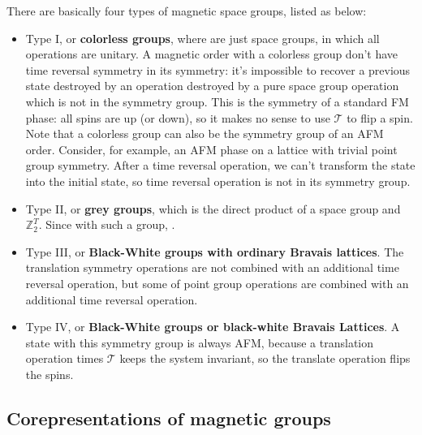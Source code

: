 \documentclass[hyperref, a4paper]{article}
\newcommand*{\concept}[1]{{\textbf{#1}}}
\begin{document}
There are basically four types of magnetic space groups, listed as below:
\begin{itemize}
    \item Type I, or \concept{colorless groups}, where are just space groups, in which all operations are 
    unitary. A magnetic order with a colorless group don't have time reversal symmetry in its symmetry: 
    it's impossible to recover a previous state destroyed by an operation destroyed by a pure space group 
    operation which is not in the symmetry group. This is the symmetry of a standard FM phase: all spins 
    are up (or down), so it makes no sense to use $\mathcal{T}$ to flip a spin. 
    Note that a colorless group can also be the symmetry group of an AFM order. Consider, for example, 
    an AFM phase on a lattice with trivial point group symmetry. After a time reversal operation, we can't 
    transform the state into the initial state, so time reversal operation is not in its symmetry group. 
    \item Type II, or \concept{grey groups}, which is the direct product of a space group and $\mathbb{Z}_2^T$.
    Since with such a group, .
    \item Type III, or \concept{Black-White groups with ordinary Bravais lattices}. The translation symmetry 
    operations are not combined with an additional time reversal operation, but some of point group operations 
    are combined with an additional time reversal operation. 
    \item Type IV, or \concept{Black-White groups or black-white Bravais Lattices}. A state with this symmetry
    group is always AFM, because a translation operation times $\mathcal{T}$ keeps the system invariant, 
    so the translate operation flips the spins.
\end{itemize}

\subsection{Corepresentations of magnetic groups}
\end{document}
